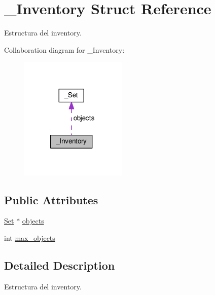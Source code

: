 \hypertarget{struct__Inventory}{\section{\+\_\+\+Inventory Struct Reference}
\label{struct__Inventory}
}


Estructura del inventory.  




Collaboration diagram for \+\_\+\+Inventory\+:
\nopagebreak
\begin{figure}[H]
\begin{center}
\leavevmode
\includegraphics[width=145pt]{struct__Inventory__coll__graph}
\end{center}
\end{figure}
\subsection*{Public Attributes}
\begin{DoxyCompactItemize}
\item 
\hyperlink{set_8h_a6d3b7f7c92cbb4577ef3ef7ddbf93161}{Set} $\ast$ \hyperlink{struct__Inventory_a478e4b50a62b9e7d5b17e335319faa97}{objects}
\item 
int \hyperlink{struct__Inventory_a80b9762e443001b51fa4839ddf074a69}{max\+\_\+objects}
\end{DoxyCompactItemize}


\subsection{Detailed Description}
Estructura del inventory. 

